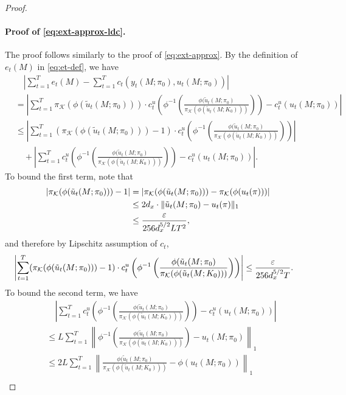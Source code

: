\begin{proof}
\paragraph{Proof of \cref{eq:ext-approx-ldc}.} The proof follows similarly to the proof of \cref{eq:ext-approx}. By the definition of $e_t(M)$ in \cref{eq:et-def}, we have
\begin{align*}
&\quad \left|\sum_{t=1}^T e_t(M)-\sum_{t=1}^T c_t(y_t(M;\pi_0),u_t(M;\pi_0))\right|\\
&=\left|\sum_{t=1}^T \pi_{\mathcal{K}}(\phi(\tilde{u}_t(M;\pi_0)))\cdot c_t^u\left(\phi^{-1}\left(\frac{\phi(\tilde{u}_t(M;\pi_0)}{\pi_{\mathcal{K}}(\phi(\tilde{u}_t(M;K_0)))}\right)\right)-c_t^u(u_t(M;\pi_0))\right|\\
&\le \left|\sum_{t=1}^T (\pi_{\mathcal{K}}(\phi(\tilde{u}_t(M;\pi_0)))-1)\cdot c_t^u\left(\phi^{-1}\left(\frac{\phi(\tilde{u}_t(M;\pi_0)}{\pi_{\mathcal{K}}(\phi(\tilde{u}_t(M;K_0)))}\right)\right)\right|\\
&\quad +\left|\sum_{t=1}^T c_t^u\left(\phi^{-1}\left(\frac{\phi(\tilde{u}_t(M;\pi_0)}{\pi_{\mathcal{K}}(\phi(\tilde{u}_t(M;K_0)))}\right)\right)-c_t^u(u_t(M;\pi_0))\right|.
\end{align*}
To bound the first term, note that
\begin{align*}
|\pi_{\mathcal{K}}(\phi(\tilde{u}_t(M;\pi_0)))-1|&=|\pi_{\mathcal{K}}(\phi(\tilde{u}_t(M;\pi_0)))-\pi_{\mathcal{K}}(\phi(u_t(\pi)))|\\
&\le 2d_x\cdot \|\tilde{u}_t(M;\pi_0)-u_t(\pi)\|_1\\
&\le \frac{\varepsilon}{256d_x^{5/2}LT^2},
\end{align*}
and therefore by Lipschitz assumption of $c_t$,
\begin{align*}
\left|\sum_{t=1}^T (\pi_{\mathcal{K}}(\phi(\tilde{u}_t(M;\pi_0)))-1)\cdot c_t^u\left(\phi^{-1}\left(\frac{\phi(\tilde{u}_t(M;\pi_0)}{\pi_{\mathcal{K}}(\phi(\tilde{u}_t(M;K_0)))}\right)\right)\right|&\le \frac{\varepsilon}{256d_x^{5/2}T}.
\end{align*}
To bound the second term, we have
\begin{align*}
& \quad \left|\sum_{t=1}^T c_t^u\left(\phi^{-1}\left(\frac{\phi(\tilde{u}_t(M;\pi_0)}{\pi_{\mathcal{K}}(\phi(\tilde{u}_t(M;K_0)))}\right)\right)-c_t^u(u_t(M;\pi_0))\right|\\
&\le L \sum_{t=1}^T \left\|\phi^{-1}\left(\frac{\phi(\tilde{u}_t(M;\pi_0)}{\pi_{\mathcal{K}}(\phi(\tilde{u}_t(M;K_0)))}\right)-u_t(M;\pi_0)\right\|_1\\
&\le 2L\sum_{t=1}^T \left\|\frac{\phi(\tilde{u}_t(M;\pi_0)}{\pi_{\mathcal{K}}(\phi(\tilde{u}_t(M;K_0)))}-\phi(u_t(M;\pi_0))\right\|_1\\

\end{align*}
\end{proof}
